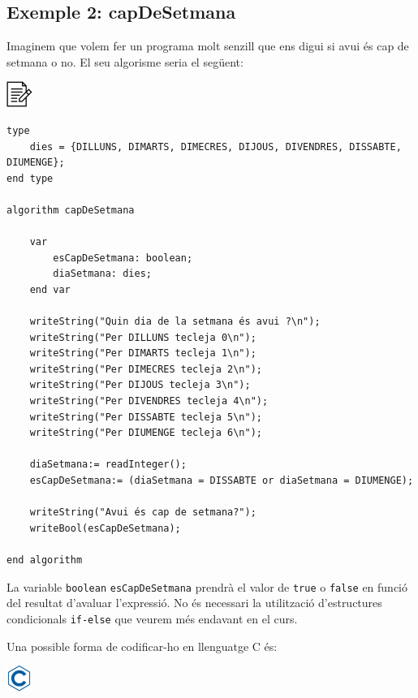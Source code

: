 \documentclass[
]{book}
\begin{document}
\hypertarget{exemple-2-capdesetmana}{%
\subsection{Exemple 2: capDeSetmana}\label{exemple-2-capdesetmana}}

Imaginem que volem fer un programa molt senzill que ens digui si avui és cap de setmana o no. El seu algorisme seria el següent:

\includegraphics{./img/alg.png}

\begin{verbatim}
type
    dies = {DILLUNS, DIMARTS, DIMECRES, DIJOUS, DIVENDRES, DISSABTE, DIUMENGE};
end type

algorithm capDeSetmana

    var
        esCapDeSetmana: boolean;
        diaSetmana: dies;
    end var

    writeString("Quin dia de la setmana és avui ?\n");
    writeString("Per DILLUNS tecleja 0\n");
    writeString("Per DIMARTS tecleja 1\n");
    writeString("Per DIMECRES tecleja 2\n");
    writeString("Per DIJOUS tecleja 3\n");
    writeString("Per DIVENDRES tecleja 4\n");
    writeString("Per DISSABTE tecleja 5\n");
    writeString("Per DIUMENGE tecleja 6\n");
 
    diaSetmana:= readInteger();
    esCapDeSetmana:= (diaSetmana = DISSABTE or diaSetmana = DIUMENGE);

    writeString("Avui és cap de setmana?");
    writeBool(esCapDeSetmana);

end algorithm
\end{verbatim}

La variable \texttt{boolean} \texttt{esCapDeSetmana} prendrà el valor de \texttt{true} o \texttt{false} en funció del resultat d'avaluar l'expressió. No és necessari la utilització d'estructures condicionals \texttt{if-else} que veurem més endavant en el curs.

Una possible forma de codificar-ho en llenguatge C és:

\includegraphics{./img/c.png}
\end{document}
